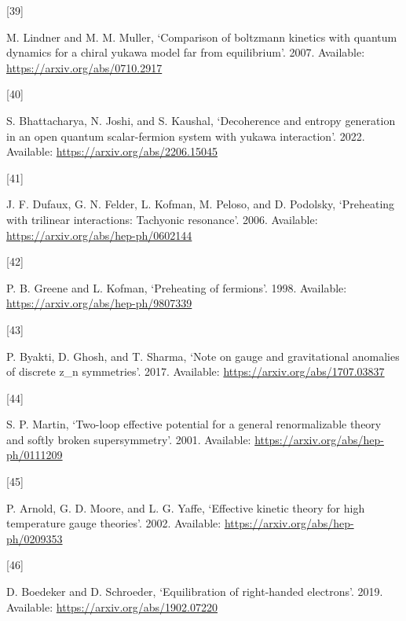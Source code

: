\documentclass[
]{article}
\newlength{\cslhangindent}
\newlength{\csllabelwidth}
\newenvironment{CSLReferences}[2] %
 {\begin{list}{}{%
  \setlength{\itemindent}{0pt}
  \setlength{\leftmargin}{0pt}
  \setlength{\parsep}{0pt}
  \ifodd #1
   \setlength{\leftmargin}{\cslhangindent}
   \setlength{\itemindent}{-1\cslhangindent}
  \fi
  \setlength{\itemsep}{#2\baselineskip}}}
 {\end{list}}
\newcommand{\CSLLeftMargin}[1]{\parbox[t]{\csllabelwidth}{\strut#1\strut}}
\newcommand{\CSLRightInline}[1]{\parbox[t]{\linewidth - \csllabelwidth}{\strut#1\strut}}
\begin{document}
\begin{CSLReferences}{0}{0}
\CSLLeftMargin{{[}39{]} }%
\CSLRightInline{M. Lindner and M. M. Muller, {`Comparison of boltzmann
kinetics with quantum dynamics for a chiral yukawa model far from
equilibrium'}. 2007. Available: \url{https://arxiv.org/abs/0710.2917}}

\CSLLeftMargin{{[}40{]} }%
\CSLRightInline{S. Bhattacharya, N. Joshi, and S. Kaushal, {`Decoherence
and entropy generation in an open quantum scalar-fermion system with
yukawa interaction'}. 2022. Available:
\url{https://arxiv.org/abs/2206.15045}}

\CSLLeftMargin{{[}41{]} }%
\CSLRightInline{J. F. Dufaux, G. N. Felder, L. Kofman, M. Peloso, and D.
Podolsky, {`Preheating with trilinear interactions: Tachyonic
resonance'}. 2006. Available:
\url{https://arxiv.org/abs/hep-ph/0602144}}

\CSLLeftMargin{{[}42{]} }%
\CSLRightInline{P. B. Greene and L. Kofman, {`Preheating of fermions'}.
1998. Available: \url{https://arxiv.org/abs/hep-ph/9807339}}

\CSLLeftMargin{{[}43{]} }%
\CSLRightInline{P. Byakti, D. Ghosh, and T. Sharma, {`Note on gauge and
gravitational anomalies of discrete z\_n symmetries'}. 2017. Available:
\url{https://arxiv.org/abs/1707.03837}}

\CSLLeftMargin{{[}44{]} }%
\CSLRightInline{S. P. Martin, {`Two-loop effective potential for a
general renormalizable theory and softly broken supersymmetry'}. 2001.
Available: \url{https://arxiv.org/abs/hep-ph/0111209}}

\CSLLeftMargin{{[}45{]} }%
\CSLRightInline{P. Arnold, G. D. Moore, and L. G. Yaffe, {`Effective
kinetic theory for high temperature gauge theories'}. 2002. Available:
\url{https://arxiv.org/abs/hep-ph/0209353}}

\CSLLeftMargin{{[}46{]} }%
\CSLRightInline{D. Boedeker and D. Schroeder, {`Equilibration of
right-handed electrons'}. 2019. Available:
\url{https://arxiv.org/abs/1902.07220}}

\end{CSLReferences}
\end{document}
